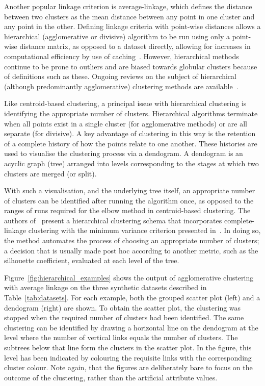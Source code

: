 Another popular linkage criterion is average-linkage, which defines the distance
between two clusters as the mean distance between any point in one cluster and
any point in the other. Defining linkage criteria with point-wise distances
allows a hierarchical (agglomerative or divisive) algorithm to be run using only
a point-wise distance matrix, as opposed to a dataset directly, allowing for
increases in computational efficiency by use of caching~\cite{Nielsen2016}.
However, hierarchical methods continue to be prone to outliers and are biased
towards globular clusters because of definitions such as these. Ongoing reviews
on the subject of hierarchical (although predominantly agglomerative) clustering
methods are available~\cite{Murtagh1983,Murtagh2012,Murtagh2017}.

Like centroid-based clustering, a principal issue with hierarchical clustering
is identifying the appropriate number of clusters. Hierarchical algorithms
terminate when all points exist in a single cluster (for agglomerative methods)
or are all separate (for divisive). A key advantage of clustering in this way is
the retention of a complete history of how the points relate to one another.
These histories are used to visualise the clustering process via a dendogram. A
dendogram is an acyclic graph (tree) arranged into levels corresponding to the
stages at which two clusters are merged (or split).

With such a visualisation, and the underlying tree itself, an appropriate number
of clusters can be identified after running the algorithm once, as opposed to
the ranges of runs required for the elbow method in centroid-based clustering.
The authors of~\cite{Tellaroli2016} present a hierarchical clustering schema
that incorporates complete-linkage clustering with the minimum variance
criterion presented in~\cite{Ward1963}. In doing so, the method automates the
process of choosing an appropriate number of clusters; a decision that is
usually made post hoc according to another metric, such as the silhouette
coefficient, evaluated at each level of the tree.

Figure~\ref{fig:hierarchical_examples} shows the output of agglomerative
clustering with average linkage on the three synthetic datasets described in
Table~\ref{tab:datasets}. For each example, both the grouped scatter plot (left)
and a dendogram (right) are shown. To obtain the scatter plot, the clustering
was stopped when the required number of clusters had been identified. The same
clustering can be identified by drawing a horizontal line on the dendogram at
the level where the number of vertical links equals the number of clusters. The
subtrees below that line form the clusters in the scatter plot. In the figure,
this level has been indicated by colouring the requisite links with the
corresponding cluster colour. Note again, that the figures are deliberately bare
to focus on the outcome of the clustering, rather than the artificial attribute
values.

